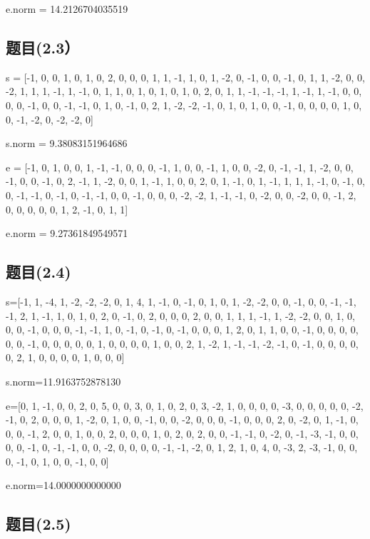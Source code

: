 \documentclass[12pt,a4paper]{article}
\numberwithin{equation}{section}
\begin{document}
e.norm = 14.2126704035519

\subsection{题目(2.3）}

s = [-1, 0, 0, 1, 0, 1, 0, 2, 0, 0, 0, 1, 1, -1, 1, 0, 1, -2, 0, -1, 0, 0, -1, 0, 1, 1, -2, 0, 0, -2, 1, 1, 1, -1, 1, -1, 0, 1, 1, 0, 1, 0, 1, 0, 1, 0, 2, 0, 1, 1, -1, -1, -1, 1, -1, 1, -1, 0, 0, 0, 0, -1, 0, 0, -1, -1, 0, 1, 0, -1, 0, 2, 1, -2, -2, -1, 0, 1, 0, 1, 0, 0, -1, 0, 0, 0, 0, 1, 0, 0, -1, -2, 0, -2, -2, 0]

s.norm = 9.38083151964686

e = [-1, 0, 1, 0, 0, 1, -1, -1, 0, 0, 0, -1, 1, 0, 0, -1, 1, 0, 0, -2, 0, -1, -1, 1, -2, 0, 0, -1, 0, 0, -1, 0, 2, -1, 1, -2, 0, 0, 1, -1, 1, 0, 0, 2, 0, 1, -1, 0, 1, -1, 1, 1, 1, -1, 0, -1, 0, 0, -1, -1, 0, -1, 0, -1, -1, 0, 0, -1, 0, 0, 0, -2, -2, 1, -1, -1, 0, -2, 0, 0, -2, 0, 0, -1, 2, 0, 0, 0, 0, 0, 1, 2, -1, 0, 1, 1]

e.norm = 9.27361849549571

\subsection{题目(2.4)}

s=[-1, 1, -4, 1, -2, -2, -2, 0, 1, 4, 1, -1, 0, -1, 0, 1, 0, 1, -2, -2, 0, 0, -1, 0, 0, -1, -1, -1, 2, 1, -1, 1, 0, 1, 0, 2, 0, -1, 0, 2, 0, 0, 0, 2, 0, 0, 1, 1, 1, -1, 1, -2, -2, 0, 0, 1, 0, 0, 0, -1, 0, 0, 0, -1, -1, 1, 0, -1, 0, -1, 0, -1, 0, 0, 0, 1, 2, 0, 1, 1, 0, 0, -1, 0, 0, 0, 0, 0, 0, -1, 0, 0, 0, 0, 0, 1, 0, 0, 0, 0, 1, 0, 0, 2, 1, -2, 1, -1, -1, -2, -1, 0, -1, 0, 0, 0, 0, 0, 2, 1, 0, 0, 0, 0, 1, 0, 0, 0]

s.norm=11.9163752878130

e=[0, 1, -1, 0, 0, 2, 0, 5, 0, 0, 3, 0, 1, 0, 2, 0, 3, -2, 1, 0, 0, 0, 0, -3, 0, 0, 0, 0, 0, -2, -1, 0, 2, 0, 0, 0, 1, -2, 0, 1, 0, 0, -1, 0, 0, -2, 0, 0, 0, -1, 0, 0, 0, 2, 0, -2, 0, 1, -1, 0, 0, 0, -1, 2, 0, 0, 1, 0, 0, 2, 0, 0, 0, 1, 0, 2, 0, 2, 0, 0, -1, -1, 0, -2, 0, -1, -3, -1, 0, 0, 0, 0, -1, 0, -1, -1, 0, 0, -2, 0, 0, 0, 0, -1, -1, -2, 0, 1, 2, 1, 0, 4, 0, -3, 2, -3, -1, 0, 0, 0, -1, 0, 1, 0, 0, -1, 0, 0]

e.norm=14.0000000000000

\subsection{题目(2.5)}
\end{document}

